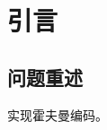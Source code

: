 \documentclass[../main]{subfiles}
\begin{document}
\chapter{引言}%
\label{cha:introduction}

\section{问题重述}%
\label{sec:problem}

\begin{Exercise}
  实现霍夫曼编码。\cite{4051119}
\end{Exercise}
\end{document}

